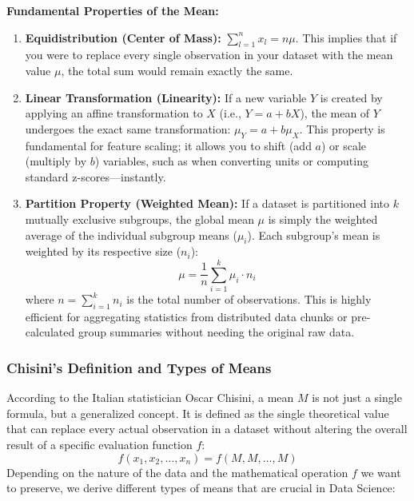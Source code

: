 \vspace{0.2cm}
\textbf{Fundamental Properties of the Mean:}
\begin{enumerate}
    \item \textbf{Equidistribution (Center of Mass):} $\sum_{l=1}^{n} x_l = n\mu$. This implies that if you were to replace every single observation in your dataset with the mean value $\mu$, the total sum would remain exactly the same. 
    
    \vs
    
    \item \textbf{Linear Transformation (Linearity):} If a new variable $Y$ is created by applying an affine transformation to $X$ (i.e., $Y = a + bX$), the mean of $Y$ undergoes the exact same transformation: $\mu_Y = a + b\mu_X$. This property is fundamental for feature scaling; it allows you to shift (add $a$) or scale (multiply by $b$) variables, such as when converting units or computing standard z-scores—instantly. 
    \vs

    
    \item \textbf{Partition Property (Weighted Mean):} If a dataset is partitioned into $k$ mutually exclusive subgroups, the global mean $\mu$ is simply the weighted average of the individual subgroup means ($\mu_i$). Each subgroup's mean is weighted by its respective size ($n_i$):
    \begin{equation}
        \mu = \frac{1}{n} \sum_{i=1}^{k} \mu_i \cdot n_i
    \end{equation}
    where $n = \sum_{i=1}^{k} n_i$ is the total number of observations. This is highly efficient for aggregating statistics from distributed data chunks or pre-calculated group summaries without needing the original raw data.
\end{enumerate}


\subsubsection{Chisini's Definition and Types of Means}

According to the Italian statistician Oscar Chisini, a mean $M$ is not just a single formula, but a generalized concept. It is defined as the single theoretical value that can replace every actual observation in a dataset without altering the overall result of a specific evaluation function $f$:
$$f(x_1, x_2, \dots, x_n) = f(M, M, \dots, M)$$
Depending on the nature of the data and the mathematical operation $f$ we want to preserve, we derive different types of means that are crucial in Data Science:

